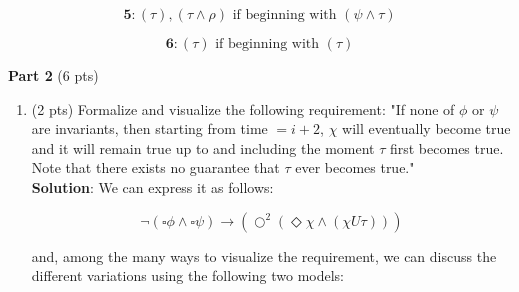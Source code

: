 \documentclass[12pt]{article}
\begin{document}
\begin{spacing}{1.5}
\begin{enumerate}
		      $$\textbf{5}: (\tau), (\tau \land \rho) \text{ if beginning with } (\psi \land \tau)$$
		      		      		      		      		      		      
		      $$\textbf{6}: (\tau) \text{ if beginning with } (\tau)$$
		      		      		      		      		      		      		              
	\end{enumerate}
						
	\textbf{Part 2} (6 pts)
						
	\begin{enumerate}
		\item (2 pts) Formalize and visualize the following requirement: "If none of $\phi$ or $\psi$ are invariants, then starting from time $=i+2$, $\chi$ will eventually become true and it will remain true up to and including the moment $\tau$ first becomes true. Note that there exists no guarantee that $\tau$ ever becomes true."\\
		      		      		      		      		      		      
		      \textbf{Solution}: We can express it as follows:
		      		      		      		      		      		      
		      $$\neg(\square \phi \land \square \psi)\rightarrow (\bigcirc^2 (\Diamond \chi \land (\chi U \tau)))$$
		      		      		      		      		      		      
		      and, among the many ways to visualize the requirement, we can discuss the different variations using the following two models:
		      		      		      		      		      		              
		      \begin{center}
		      			      			      			      			      			      	

\end{center}
\end{enumerate}
\end{spacing}
\end{document}
